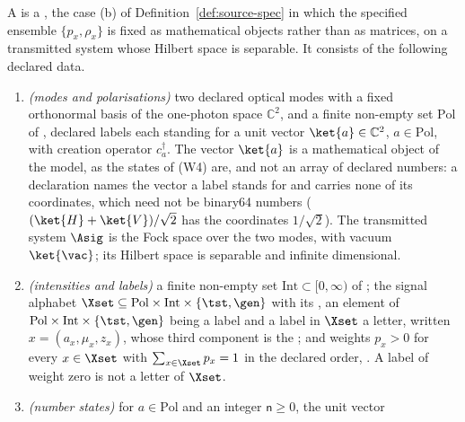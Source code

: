\begin{definition}\label{def:wcp-model}
A 
is a , the case (b) of
Definition~\ref{def:source-spec} in which the specified ensemble
$\{p_x,\rho_x\}$ is fixed as mathematical objects rather than as matrices, on
a transmitted system whose Hilbert space is separable. It consists of the
following declared data.
\begin{enumerate}[label=(W\arabic*),leftmargin=3.0em]
\item \emph{(modes and polarisations)} two declared optical modes with a fixed
orthonormal basis of the one-photon space $\mathbb{C}^2$, and a finite
non-empty set $\mathrm{Pol}$ of
,
declared labels each standing for a unit vector $\ket{a}\in\mathbb{C}^2$,
$a\in\mathrm{Pol}$, with creation operator $c^{\dagger}_a$. The vector
$\ket{a}$ is a mathematical object of the model, as the states of (W4) are,
and not an array of declared numbers: a declaration names the vector a label
stands for and carries none of its coordinates, which need not be binary64
numbers ($(\ket{H}+\ket{V})/\sqrt2$ has the coordinates $1/\sqrt2$). The
transmitted system $\Asig$ is the Fock space over the two modes, with vacuum
$\ket{\vac}$; its Hilbert space is separable and infinite dimensional.
\item \emph{(intensities and labels)} a finite non-empty set
$\mathrm{Int}\subset[0,\infty)$ of
;
the signal alphabet
$\Xset\subseteq\mathrm{Pol}\times\mathrm{Int}\times\{\tst,\gen\}$ with its
, an element of
$\mathrm{Pol}\times\mathrm{Int}\times\{\tst,\gen\}$ being a label and a label in
$\Xset$ a letter, written $x=(a_x,\mu_x,z_x)$, whose third component is the
;
and weights $p_x>0$ for every $x\in\Xset$ with $\sum_{x\in\Xset}p_x=1$ in the
declared order, . A label
of weight zero is not a letter of $\Xset$.
\item \emph{(number states)} for $a\in\mathrm{Pol}$ and an integer
$\mathsf{n}\ge0$, the unit vector
\begin{equation}\label{eq:numberstate}

\end{equation}
\end{enumerate}
\end{definition}
